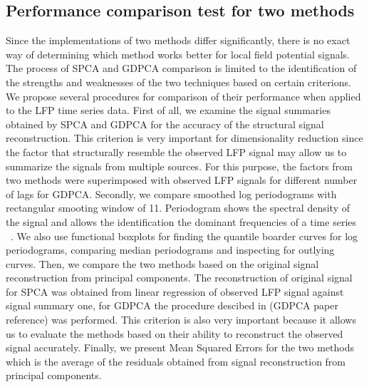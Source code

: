 \documentclass[12pt]{article}
\begin{document}
\subsection{Performance comparison test for two methods} \label{sec:comparison}
Since the implementations of two methods differ significantly, there is no exact way of determining which method works better for local field potential signals. The process of SPCA and GDPCA comparison is limited to the identification of the strengths and weaknesses of the two techniques based on certain criterions. We propose several procedures for comparison of their performance when applied to the LFP time series data. First of all, we examine the signal summaries obtained by SPCA and GDPCA for the accuracy of the structural signal reconstruction. This criterion is very important for dimensionality reduction since the factor that structurally resemble the observed LFP signal may allow us to summarize the signals from multiple sources. For this purpose, the factors from two methods were superimposed with observed LFP signals for different number of lags for GDPCA. Secondly, we compare smoothed log periodograms with rectangular smooting window of 11. Periodogram shows the spectral density of the signal and allows the identification the dominant frequencies of a time series ~\citep{shumway}. We also use functional boxplots for finding the quantile boarder curves for log periodograms, comparing median periodograms and inspecting for outlying curves. Then, we compare the two methods based on the original signal reconstruction from principal components. The reconstruction of original signal for SPCA was obtained from linear regression of observed LFP signal against signal summary one, for GDPCA the procedure descibed in (GDPCA paper reference) was performed. This criterion is also very important because it allows us to evaluate the methods based on their ability to reconstruct the observed signal accurately. Finally, we present Mean Squared Errors for the two methods which is the average of the residuals obtained from signal reconstruction from principal components.
\end{document}

